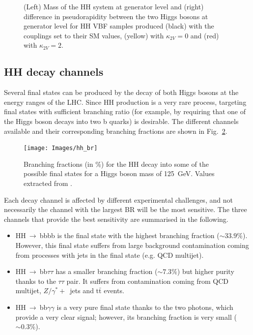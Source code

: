 \documentclass[../main.tex]{subfiles}
\begin{document}
\begin{figure}[h!]
\begin{center}
\end{center}
\caption{(Left) Mass of the HH system at generator level and (right) difference in pseudorapidity between the two Higgs bosons at generator level for HH VBF samples produced (black) with the couplings set to their SM values, (yellow) with $\kappa_{2V} = 0$ and (red) with $\kappa_{2V} = 2$. }
\label{theo:fig:genhh_mass}
\end{figure}


\subsection{HH decay channels}

Several final states can be produced by the decay of both Higgs bosons at the energy ranges of the LHC. Since HH production is a very rare process, targeting final states with sufficient branching ratio (for example, by requiring that one of the Higgs boson decays into two b quarks) is desirable. The different channels available and their corresponding branching fractions are shown in Fig.~\ref{theo:fig:hh_br}.

\begin{figure}[h!]
\begin{center}
\texttt{[image: Images/hh\_br]}
\end{center}
\caption{Branching fractions (in \%) for the HH decay into some of the possible final states for a Higgs boson mass of 125~GeV. Values extracted from \cite{intro:theo:yellow_higgs}.}
\label{theo:fig:hh_br}
\end{figure}

Each decay channel is affected by different experimental challenges, and not necessarily the channel with the largest BR will be the most sensitive. The three channels that provide the best sensitivity are summarised in the following.

\begin{itemize}
\item HH$~\to~$bbbb is the final state with the highest branching fraction ($\sim 33.9\%$). However, this final state suffers from large background contamination coming from processes with jets in the final state (e.g. QCD multijet).
\item HH$~\to~$bb$\tau\tau$ has a smaller branching fraction ($\sim7.3\%$) but higher purity thanks to the $\tau\tau$ pair. It suffers from contamination coming from QCD multijet, $Z/\gamma^*+$~jets and t$\bar{\text{t}}$ events.
\item HH$~\to~$bb$\gamma\gamma$ is a very pure final state thanks to the two photons, which provide a very clear signal; however, its branching fraction is very small ($\sim0.3\%$).
\end{itemize}
\end{document}
